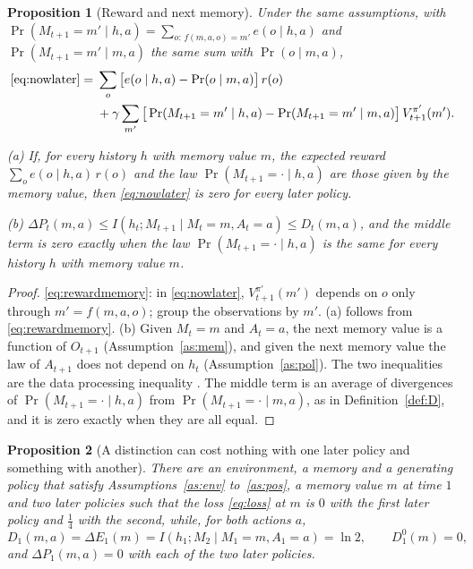 \documentclass{article}
\newtheorem{proposition}{Proposition}[section]
\theoremstyle{definition}
\numberwithin{equation}{section}
\newcommand{\dE}{\Delta E}
\newcommand{\dP}{\Delta P}
\begin{document}
\begin{proposition}[Reward and next memory]\label{prop:rewardmemory}
Under the same assumptions, with $\Pr(M_{t+1}=m'\mid h,a)=\sum_{o:\,f(m,a,o)=m'}e(o\mid h,a)$ and $\Pr(M_{t+1}=m'\mid m,a)$ the same sum with $\Pr(o\mid m,a)$,
\begin{align}
\eqref{eq:nowlater}={}&\sum_o\big[e(o\mid h,a)-\Pr(o\mid m,a)\big]\,r(o) \nonumber\\
&+\gamma\sum_{m'}\big[\Pr(M_{t+1}=m'\mid h,a)-\Pr(M_{t+1}=m'\mid m,a)\big]\,V^{\pi'}_{t+1}(m'). \label{eq:rewardmemory}
\end{align}

(a) If, for every history $h$ with memory value $m$, the expected reward $\sum_oe(o\mid h,a)\,r(o)$ and the law $\Pr(M_{t+1}=\cdot\mid h,a)$ are those given by the memory value, then \eqref{eq:nowlater} is zero for every later policy.

(b) $\dP_t(m,a)\le I(h_t;M_{t+1}\mid M_t=m,A_t=a)\le D_t(m,a)$, and the middle term is zero exactly when the law $\Pr(M_{t+1}=\cdot\mid h,a)$ is the same for every history $h$ with memory value $m$.
\end{proposition}

\begin{proof}
\eqref{eq:rewardmemory}: in \eqref{eq:nowlater}, $V^{\pi'}_{t+1}(m')$ depends on $o$ only through $m'=f(m,a,o)$; group the observations by $m'$. (a) follows from \eqref{eq:rewardmemory}. (b) Given $M_t=m$ and $A_t=a$, the next memory value is a function of $O_{t+1}$ (Assumption~\ref{as:mem}), and given the next memory value the law of $A_{t+1}$ does not depend on $h_t$ (Assumption~\ref{as:pol}). The two inequalities are the data processing inequality \citep[Ch.~2]{cover2006elements}. The middle term is an average of divergences of $\Pr(M_{t+1}=\cdot\mid h,a)$ from $\Pr(M_{t+1}=\cdot\mid m,a)$, as in Definition~\ref{def:D}, and it is zero exactly when they are all equal.
\end{proof}

\begin{proposition}[A distinction can cost nothing with one later policy and something with another]\label{prop:example}
There are an environment, a memory and a generating policy that satisfy Assumptions~\ref{as:env} to~\ref{as:pos}, a memory value $m$ at time $1$ and two later policies such that the loss \eqref{eq:loss} at $m$ is $0$ with the first later policy and $\tfrac14$ with the second, while, for both actions $a$,
\[
D_1(m,a)=\dE_1(m)=I(h_1;M_2\mid M_1=m,A_1=a)=\ln2,\qquad D^0_1(m)=0,
\]
and $\dP_1(m,a)=0$ with each of the two later policies.
\end{proposition}
\end{document}
